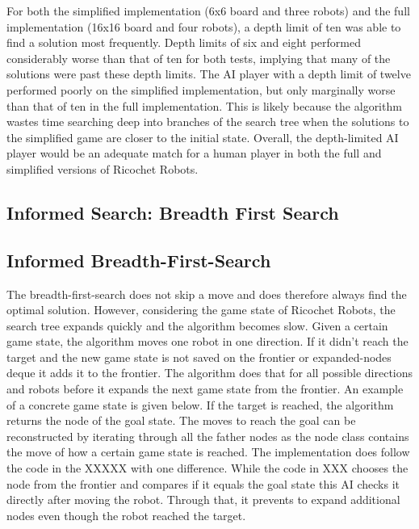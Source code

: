 \documentclass[a4paper,10pt]{article}
\begin{document}
  For both the simplified implementation (6x6 board and three robots) and the full implementation (16x16 board and four robots), a depth limit of ten was able to
  find a solution most frequently.  Depth limits of six and eight performed considerably worse than that of ten for both tests, implying that many of the solutions were
  past these depth limits.  The AI player with a depth limit of twelve performed poorly on the simplified implementation, but only marginally worse than that of ten in
  the full implementation.  This is likely because the algorithm wastes time searching deep into branches of the search tree when the solutions to the simplified game
  are closer to the initial state.  Overall, the depth-limited AI player would be an adequate match for a human player in both the full and simplified versions of
  Ricochet Robots.\\


  \subsection{Informed Search: Breadth First Search}
  \subsection{Informed Breadth-First-Search}
  The breadth-first-search does not skip a move and does therefore always find the optimal solution. However, considering the game state of Ricochet Robots, the search tree expands quickly and the algorithm becomes slow. Given a certain game state, the algorithm moves one robot in one direction. If it didn't reach the target and the new game state is not saved on the frontier or expanded-nodes deque it adds it to the frontier. The algorithm does that for all possible directions and robots before it expands the next game state from the frontier. An example of a concrete game state is given below. If the target is reached, the algorithm returns the node of the goal state. The moves to reach the goal can be reconstructed by iterating through all the father nodes as the node class contains the move of how a certain game state is reached. The implementation does follow the code in the XXXXX with one difference. While the code in XXX chooses the node from the frontier and compares if it equals the goal state this AI checks it directly after moving the robot. Through that, it prevents to expand additional nodes even though the robot reached the target.
  
\end{document}
